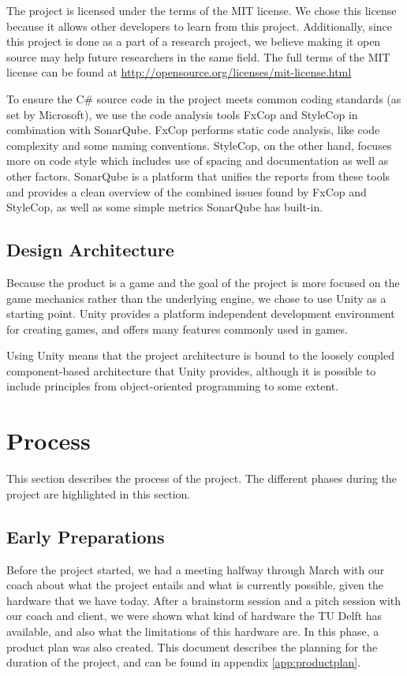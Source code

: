 			The project is licensed under the terms of the MIT license. We chose
			this license because it allows other developers to learn from this
			project. Additionally, since this project is done as a part of a
			research project, we believe making it open source may
			help future researchers in the same field. The full terms of the MIT
			license can be found at \url{http://opensource.org/licenses/mit-license.html}
			
			To ensure the C\# source code in the project meets common coding standards
			(as set by Microsoft), we use the code analysis tools FxCop and StyleCop
			in combination with SonarQube. FxCop performs static code analysis, like
			code complexity and some naming conventions. StyleCop, on the other hand,
			focuses more on code style which includes use of spacing and
			documentation as well as other factors. SonarQube is a platform that
			unifies the reports from these tools and provides a clean overview of the
			combined issues found by FxCop and StyleCop, as well as some simple metrics
			SonarQube has built-in.
			
		\subsection{Design Architecture} \label{ssec:designarchitecture}
			Because the product is a game and the goal of the project is more
			focused on the game mechanics rather than the underlying engine, we chose
			to use Unity as a starting point. Unity provides a platform independent
			development environment for creating games, and offers many features 
			commonly used in games.
			
			Using Unity means that the project architecture is bound to the
			loosely coupled component-based architecture that Unity provides,
			although it is possible to include principles from object-oriented
			programming to some extent.
			
		\section{Process}\label{sec:process}
			This section describes the process of the project. The different phases
			during the project are highlighted in this section.
		
		\subsection{Early Preparations} \label{ssec:preparations}
			Before the project started, we had a meeting halfway through March
			with our coach about what the project entails and what is currently
			possible, given the hardware that we have today. After a brainstorm
			session and a pitch session with our coach and client, we were shown 
			what kind of hardware the TU Delft has available, and also what the 
			limitations of this hardware are. In this phase, a product plan was
			also created. This document describes the planning for the duration
			of the project, and can be found in appendix \ref{app:productplan}.
		
